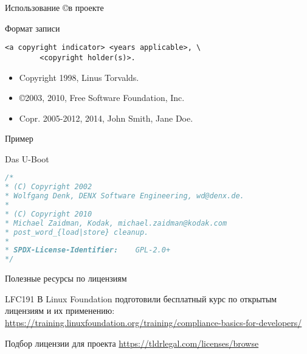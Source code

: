 \begin{frame}[fragile]{Использование \copyright в проекте}
    \begin{block}{Формат записи}
        \begin{verbatim}
<a copyright indicator> <years applicable>, \
        <copyright holder(s)>.
        \end{verbatim}
    \end{block}
    \begin{itemize}
        \item Copyright 1998, Linus Torvalds.
        \item \copyright 2003, 2010, Free Software Foundation, Inc.
        \item Copr. 2005-2012, 2014, John Smith, Jane Doe.
    \end{itemize}
\end{frame}

\begin{frame}[fragile]{Пример}
    \begin{block}{Das U-Boot}
    \begin{lstlisting}[language=C]
/*
* (C) Copyright 2002
* Wolfgang Denk, DENX Software Engineering, wd@denx.de.
*
* (C) Copyright 2010
* Michael Zaidman, Kodak, michael.zaidman@kodak.com
* post_word_{load|store} cleanup.
*
* SPDX-License-Identifier:    GPL-2.0+
*/
\end{lstlisting}
    \end{block}
\end{frame}

\begin{frame}{Полезные ресурсы по лицензиям}
\begin{block}{LFC191}
    В Linux Foundation подготовили бесплатный курс по открытым лицензиям и их применению:\\
    \url{https://training.linuxfoundation.org/training/compliance-basics-for-developers/}
\end{block}
\begin{block}{Подбор лицензии для проекта}
    \url{https://tldrlegal.com/licenses/browse}
\end{block}
\end{frame}

